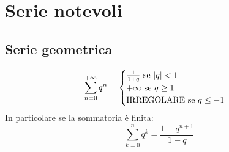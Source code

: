 \section{Serie notevoli}
\subsection{Serie geometrica}
\begin{equation}
\displaystyle \sum_{n = 0}^{+\infty} q^n = \begin{cases}
\frac{1}{1 + q} \text{ se } |q| < 1\\
+\infty \text{ se } q \geq 1\\
\text{IRREGOLARE se } q \leq -1\\
\end{cases}
\end{equation}
In particolare se la sommatoria è finita:
\begin{equation}
\displaystyle \sum_{k = 0}^{n} q^k = \frac{1 - q^{n + 1}}{1 - q}
\end{equation}